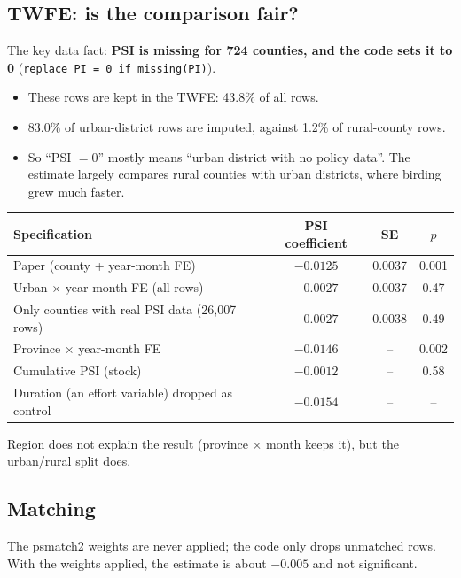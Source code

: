 \documentclass[11pt]{article}
\begin{document}
\subsection{TWFE: is the comparison fair?}
The key data fact: \textbf{PSI is missing for 724 counties, and the code sets it to 0} (\texttt{replace PI = 0 if missing(PI)}).
\begin{itemize}
\item These rows are kept in the TWFE: 43.8\% of all rows.
\item 83.0\% of urban-district rows are imputed, against 1.2\% of rural-county rows.
\item So ``PSI $=0$'' mostly means ``urban district with no policy data''. The estimate largely compares rural counties with urban districts, where birding grew much faster.
\end{itemize}

\begin{center}
\small
\begin{tabular}{l c c c}
\toprule
Specification & PSI coefficient & SE & $p$ \\
\midrule
Paper (county + year-month FE) & $-0.0125$ & 0.0037 & 0.001 \\
Urban $\times$ year-month FE (all rows) & $-0.0027$ & 0.0037 & 0.47 \\
Only counties with real PSI data (26,007 rows) & $-0.0027$ & 0.0038 & 0.49 \\
Province $\times$ year-month FE & $-0.0146$ & -- & 0.002 \\
Cumulative PSI (stock) & $-0.0012$ & -- & 0.58 \\
Duration (an effort variable) dropped as control & $-0.0154$ & -- & -- \\
\bottomrule
\end{tabular}
\end{center}
Region does not explain the result (province $\times$ month keeps it), but the urban/rural split does.

\subsection{Matching}
The psmatch2 weights are never applied; the code only drops unmatched rows. With the weights applied, the estimate is about $-0.005$ and not significant.
\end{document}
